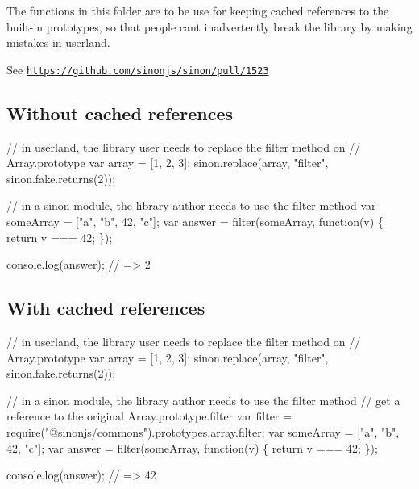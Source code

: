 The functions in this folder are to be use for keeping cached references to the built-\/in prototypes, so that people can\textquotesingle{}t inadvertently break the library by making mistakes in userland.

See \href{https://github.com/sinonjs/sinon/pull/1523}{\tt https\+://github.\+com/sinonjs/sinon/pull/1523}

\subsection*{Without cached references}


\begin{DoxyCode}
// in userland, the library user needs to replace the filter method on
// Array.prototype
var array = [1, 2, 3];
sinon.replace(array, "filter", sinon.fake.returns(2));

// in a sinon module, the library author needs to use the filter method
var someArray = ["a", "b", 42, "c"];
var answer = filter(someArray, function(v) \{
    return v === 42;
\});

console.log(answer);
// => 2
\end{DoxyCode}


\subsection*{With cached references}


\begin{DoxyCode}
// in userland, the library user needs to replace the filter method on
// Array.prototype
var array = [1, 2, 3];
sinon.replace(array, "filter", sinon.fake.returns(2));

// in a sinon module, the library author needs to use the filter method
// get a reference to the original Array.prototype.filter
var filter = require("@sinonjs/commons").prototypes.array.filter;
var someArray = ["a", "b", 42, "c"];
var answer = filter(someArray, function(v) \{
    return v === 42;
\});

console.log(answer);
// => 42
\end{DoxyCode}
 